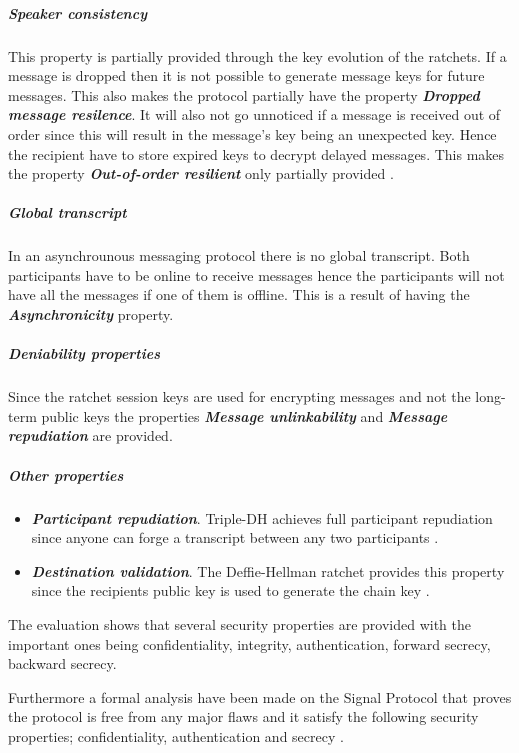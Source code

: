 \subparagraph{Speaker consistency}
This property is partially provided through the key evolution of the ratchets. If a message is dropped then it is not possible to generate message keys for future messages. This also makes the protocol partially have the property \emph{\textbf{Dropped message resilence}}. It will also not go unnoticed if a message is received out of order since this will result in the message's key being an unexpected key. Hence the recipient have to store expired keys to decrypt delayed messages. This makes the property \emph{\textbf{Out-of-order resilient}} only partially provided \cite{sok}.

\subparagraph{Global transcript} 
In an asynchrounous messaging protocol there is no global transcript. Both participants have to be online to receive messages hence the participants will not have all the messages if one of them is offline. This is a result of having the \textbf{\emph{Asynchronicity}} property.

\subparagraph{Deniability properties}

Since the ratchet session keys are used for encrypting messages and not the long-term public keys the properties \textbf{\emph{Message unlinkability}} and \textbf{\emph{Message repudiation}} are provided. 


\subparagraph{Other properties}

\begin{itemize}
	\item \textbf{\emph{Participant repudiation}}. Triple-DH achieves full participant repudiation since anyone can forge a transcript between any two participants \cite{sok}.
	\item \textbf{\emph{Destination validation}}. The Deffie-Hellman ratchet provides this property since the recipients public key is used to generate the chain key \cite{sok}. %
\end{itemize}


The evaluation shows that several security properties are provided with the important ones being confidentiality, integrity, authentication, forward secrecy, backward secrecy. 

Furthermore a formal analysis have been made on the Signal Protocol that proves the protocol is free from any major flaws and it satisfy the following security properties; confidentiality, authentication and secrecy \cite{Signal}. 


